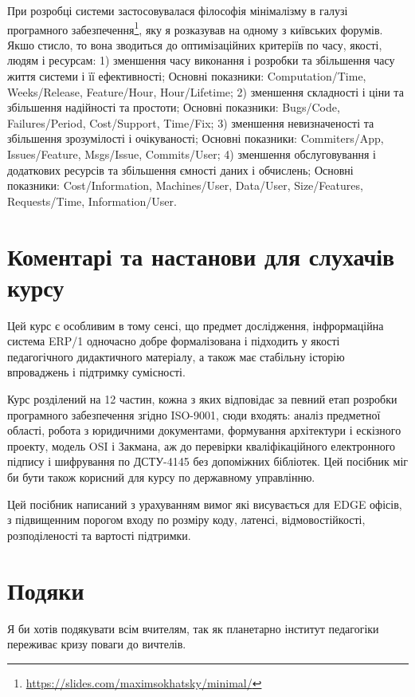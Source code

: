 При розробці системи застосовувалася філософія мінімалізму в галузі
програмного забезпечення\footnote{\url{https://slides.com/maximsokhatsky/minimal/}},
яку я розказував на одному з київських форумів. Якшо стисло, то вона
зводиться до оптимізаційних критеріїв по часу, якості, людям і ресурсам:
1) зменшення часу виконання і розробки та збільшення часу життя системи і її ефективності;
Основні показники: Computation/Time, Weeks/Release, Feature/Hour, Hour/Lifetime;
2) зменшення складності і ціни та збільшення надійності та простоти;
Основні показники: Bugs/Code, Failures/Period, Cost/Support, Time/Fix;
3) зменшення невизначеності та збільшення зрозумілості і очікуваності;
Основні показники: Commiters/App, Issues/Feature, Msgs/Issue, Commits/User;
4) зменшення обслуговування і додаткових ресурсів та збільшення ємності даних і обчислень;
Основні показники: Cost/Information, Machines/User, Data/User,
Size/Features, Requests/Time, Information/User.

\section*{Коментарі та настанови для слухачів курсу}

Цей курс є особливим в тому сенсі, що предмет дослідження,
інфрормаційна система ERP/1 одночасно добре формалізована
і підходить у якості педагогічного дидактичного матеріалу,
а також має стабільну історію впроваджень і підтримку сумісності.

Курс розділений на 12 частин, кожна з яких відповідає за певний
етап розробки програмного забезпечення згідно ISO-9001, сюди входять:
аналіз предметної області, робота з юридичними документами, формування
архітектури і ескізного проекту, модель OSI і Закмана, аж до перевірки
кваліфікаційного електронного підпису і шифрування по ДСТУ-4145 без
допоміжних бібліотек. Цей посібник міг би бути також корисний
для курсу по державному управлінню.

Цей посібник написаний з урахуванням вимог які висувається для EDGE офісів,
з підвищенним порогом входу по розміру коду, латенсі, відмовостійкості,
розподіленості та вартості підтримки.

\section*{Подяки}

Я би хотів подякувати всім вчителям, так як планетарно інститут
педагогіки переживає кризу поваги до вичтелів.

